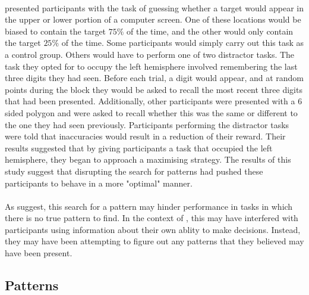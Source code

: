 \documentclass[12pt]{article}
\begin{document}
\paragraph{} \cite{wolford2004searching} presented participants with the task of guessing whether a target would appear in the upper or lower portion of a computer screen. One of these locations would be biased to contain the target $75\%$ of the time, and the other would only contain the target $25\%$ of the time. Some participants would simply carry out this task as a control group. Others would have to perform one of two distractor tasks. The task they opted for to occupy the left hemisphere involved remembering the last three digits they had seen. Before each trial, a digit would appear, and at random points during the block they would be asked to recall the most recent three digits that had been presented. Additionally, other participants were presented with a 6 sided polygon and were asked to recall whether this was the same or different to the one they had seen previously. Participants performing the distractor tasks were told that inaccuracies would result in a reduction of their reward. Their results suggested that by giving participants a task that occupied the left hemisphere, they began to approach a maximising strategy. The results of this study suggest that disrupting the search for patterns had pushed these participants to behave in a more "optimal" manner. 

\paragraph{} As \cite{wolford2004searching} suggest, this search for a pattern may hinder performance in tasks in which there is no true pattern to find. In the context of \cite{clarke2015failure}, this may have interfered with participants using information about their own ablity to make decisions. Instead, they may have been attempting to figure out any patterns that they believed may have been present. %


\subsection*{Patterns}
\end{document}
